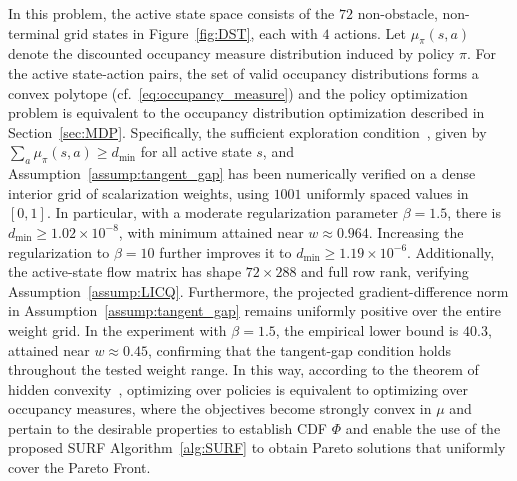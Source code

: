 \documentclass{article}
\newcommand{\Farc}{\Phi}
\begin{document}
In this problem, the active state space consists of the $72$ non-obstacle, non-terminal grid states in Figure~\ref{fig:DST}, each with $4$ actions. 
Let $\mu_\pi(s,a)$ denote the discounted occupancy measure distribution induced by policy $\pi$. For the active state-action pairs, the set of valid occupancy distributions forms a convex polytope (cf.~\eqref{eq:occupancy_measure}) and the policy optimization problem is equivalent to the occupancy distribution optimization described in Section~\ref{sec:MDP}. Specifically, the sufficient exploration condition~\citep{zhang2020variational}, given by $\sum_a \mu_\pi(s,a)\geq d_{\min}$ for all active state $s$, and Assumption~\ref{assump:tangent_gap} has been numerically verified on a dense interior grid of scalarization weights, using $1001$ uniformly spaced values in $[0,1]$. 
In particular, with a moderate regularization parameter $\beta=1.5$, there is $d_{\min}\geq 1.02\times 10^{-8}$, with minimum attained near $w\approx0.964$. Increasing the regularization to $\beta=10$ further improves it to $d_{\min}\geq 1.19\times 10^{-6}$. Additionally,
the active-state flow matrix has shape $72\times 288$ and full row rank, verifying Assumption~\ref{assump:LICQ}. 
Furthermore, the projected gradient-difference norm in Assumption~\ref{assump:tangent_gap} remains uniformly positive over the entire weight grid. In the experiment with $\beta=1.5$, the empirical lower bound is $40.3$, attained near $w\approx0.45$, confirming that the tangent-gap condition holds throughout the tested weight range.
In this way, according to the theorem of hidden convexity~\citep{fatkhullin2025stochastic}, optimizing over policies is equivalent to optimizing over occupancy measures, where the objectives become strongly convex in $\mu$ and pertain to the desirable properties to establish CDF $\Farc$ and enable the use of the proposed SURF Algorithm~\ref{alg:SURF} to obtain Pareto solutions that uniformly cover the Pareto Front.
\end{document}
